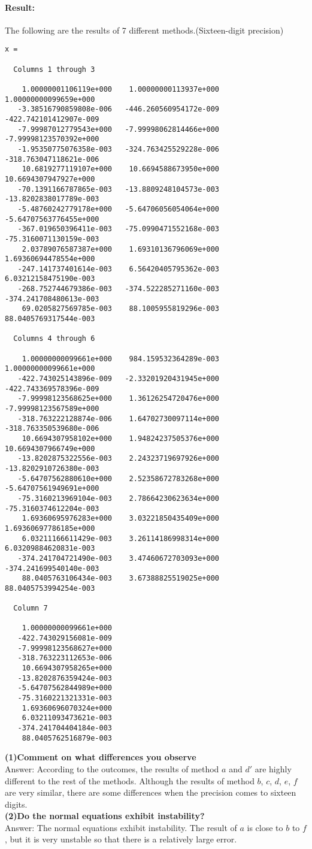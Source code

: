 \documentclass[11pt]{article}
\begin{document}
\paragraph{Result:}The following are the results of 7 different methods.(Sixteen-digit precision)
{\small \begin{verbatim}
x =

  Columns 1 through 3

    1.00000001106119e+000    1.00000000113937e+000    1.00000000099659e+000
   -3.38516790859808e-006   -446.260560954172e-009   -422.742101412907e-009
   -7.99987012779543e+000   -7.99998062814466e+000   -7.99998123570392e+000
   -1.95350775076358e-003   -324.763425529228e-006   -318.763047118621e-006
    10.6819277119107e+000    10.6694588673950e+000    10.6694307947927e+000
   -70.1391166787865e-003   -13.8809248104573e-003   -13.8202838017789e-003
   -5.48760242779178e+000   -5.64706056054064e+000   -5.64707563776455e+000
   -367.019650396411e-003   -75.0990471552168e-003   -75.3160071130159e-003
    2.03789076587387e+000    1.69310136796069e+000    1.69360694478554e+000
   -247.141737401614e-003    6.56420405795362e-003    6.03212158475190e-003
   -268.752744679386e-003   -374.522285271160e-003   -374.241708480613e-003
    69.0205827569785e-003    88.1005955819296e-003    88.0405769317544e-003

  Columns 4 through 6

    1.00000000099661e+000    984.159532364289e-003    1.00000000099661e+000
   -422.743025143896e-009   -2.33201920431945e+000   -422.743369578396e-009
   -7.99998123568625e+000    1.36126254720476e+000   -7.99998123567589e+000
   -318.763222128874e-006    1.64702730097114e+000   -318.763350539680e-006
    10.6694307958102e+000    1.94824237505376e+000    10.6694307966749e+000
   -13.8202875322556e-003    2.24323719697926e+000   -13.8202910726380e-003
   -5.64707562880610e+000    2.52358672783268e+000   -5.64707561949691e+000
   -75.3160213969104e-003    2.78664230623634e+000   -75.3160374612204e-003
    1.69360695976283e+000    3.03221850435409e+000    1.69360697786185e+000
    6.03211166611429e-003    3.26114186998314e+000    6.03209884620831e-003
   -374.241704721490e-003    3.47460672703093e+000   -374.241699540140e-003
    88.0405763106434e-003    3.67388825519025e+000    88.0405753994254e-003

  Column 7

    1.00000000099661e+000
   -422.743029156081e-009
   -7.99998123568627e+000
   -318.763223112653e-006
    10.6694307958265e+000
   -13.8202876359424e-003
   -5.64707562844989e+000
   -75.3160221321331e-003
    1.69360696070324e+000
    6.03211093473621e-003
   -374.241704404184e-003
    88.0405762516879e-003
\end{verbatim}}
\textbf{(1)Comment on what differences you observe}\\
Answer: According to the outcomes, the results of method $a$ and $d'$ are highly different to the rest of the methods. Although the results of method $b$, $c$, $d$, $e$, $f$ are very similar, there are some differences when the precision comes to sixteen digits.\\

\textbf{(2)Do the normal equations exhibit instability?}\\
Answer: The normal equations exhibit instability. The result of $a$ is close to $b$ to $f$, but it is very unstable so that there is a relatively large error.
\end{document}
